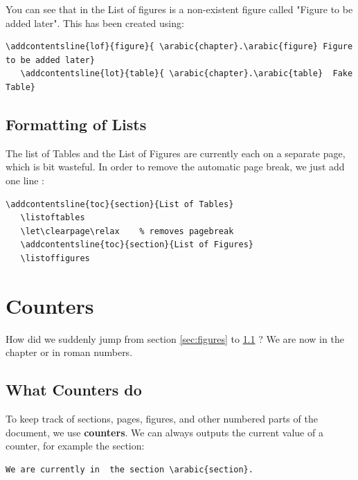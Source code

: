 \documentclass[a4paper,10pt]{report} %
\begin{document}
  You can see that in the List of figures is a non-existent figure called "Figure to be added later". This has been created using: 
  
  
   \begin{lstlisting}[language={[latex]tex},
    frame=single,
    basicstyle=\footnotesize\color{darkgray}, 
    keywordstyle=\bf\color{magenta},
    commentstyle=\color{ForestGreen},  %
    breaklines=true
   ]
   \addcontentsline{lof}{figure}{ \arabic{chapter}.\arabic{figure} Figure to be added later}
   \addcontentsline{lot}{table}{ \arabic{chapter}.\arabic{table}  Fake Table}
\end{lstlisting}

\subsection{Formatting of Lists}

The list of Tables and the List of Figures are currently each on a separate page, which is bit wasteful. In order to remove the automatic page break, we just add one line : 
\begin{lstlisting}[language={[latex]tex}, 
  frame=single,
  basicstyle=\footnotesize\color{darkgray}, 
  keywordstyle=\bf\color{magenta},
  commentstyle=\color{ForestGreen},  %
  breaklines=true
  ]
   \addcontentsline{toc}{section}{List of Tables}
   \listoftables  
   \let\clearpage\relax    % removes pagebreak                       
   \addcontentsline{toc}{section}{List of Figures}  
   \listoffigures
\end{lstlisting}

 \setcounter{section}{1}
 \section{Counters}%
How did we suddenly jump from section \ref{sec:figures} to \ref{sec:counters}  ? We are now in the chapter  or  in roman numbers.\\

\subsection{What Counters do}\label{sec:counters}
To keep track of sections, pages, figures, and other numbered parts of the document, we use \textbf{counters}. We can always outputs the current value of a counter, for example the section:
\begin{lstlisting}[language={[latex]tex}, 
  frame=single,
  basicstyle=\footnotesize\color{darkgray}, 
  keywordstyle=\bf\color{magenta},
  commentstyle=\color{ForestGreen},  %
  breaklines=true
  ]
  We are currently in  the section \arabic{section}.
\end{lstlisting}
\end{document}
